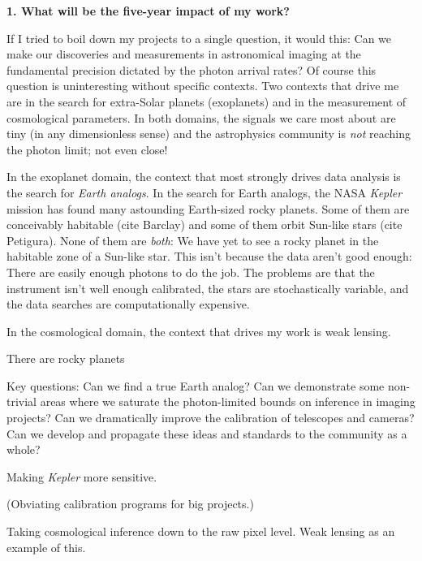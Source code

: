\documentclass[11pt, letterpaper]{article}
\begin{document}
\sloppy\sloppypar

\noindent\textbf{1. What will be the five-year impact of my work?}
\smallskip

If I tried to boil down my projects to a single question, it would this:
Can we make our discoveries and measurements in astronomical imaging
at the fundamental precision dictated by the photon arrival rates?
Of course this question is uninteresting without specific contexts.
Two contexts that drive me are in the search for extra-Solar planets
(exoplanets) and in the measurement of cosmological parameters.
In both domains, the signals we care most about are tiny (in any
dimensionless sense) and the astrophysics community is \emph{not}
reaching the photon limit; not even close!

In the exoplanet domain, the context that most strongly drives data
analysis is the search for \emph{Earth analogs}.
In the search for Earth analogs, the NASA \textsl{Kepler} mission has
found many astounding Earth-sized rocky planets.
Some of them are conceivably habitable (cite Barclay) and some of them orbit Sun-like
stars (cite Petigura).
None of them are \emph{both}: We have yet to see a rocky planet in the
habitable zone of a Sun-like star.
This isn't because the data aren't good enough:
There are easily enough photons to do the job.
The problems are that the instrument isn't well enough calibrated, the
stars are stochastically variable, and the data searches are
computationally expensive.

In the cosmological domain, the context that drives my work is weak
lensing.


There are rocky planets

Key questions: Can we find a true Earth analog?  Can we demonstrate
some non-trivial areas where we saturate the photon-limited bounds on
inference in imaging projects?  Can we dramatically improve the
calibration of telescopes and cameras?  Can we develop and propagate
these ideas and standards to the community as a whole?

Making \textsl{Kepler} more sensitive.

(Obviating calibration programs for big projects.)

Taking cosmological inference down to the raw pixel level.  Weak
lensing as an example of this.
\end{document}
